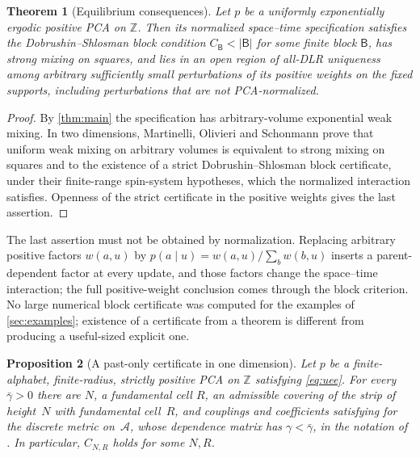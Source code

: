 \documentclass[11pt]{article}
\theoremstyle{plain}
\newtheorem{theorem}{Theorem}[section]
\newtheorem{proposition}[theorem]{Proposition}
\theoremstyle{definition}
\theoremstyle{remark}
\newcommand{\A}{\mathcal{A}}
\newcommand{\Z}{\mathbb{Z}}
\begin{document}
\begin{theorem}[Equilibrium consequences]
\label{thm:equilibrium}
Let $p$ be a uniformly exponentially ergodic positive PCA on $\Z$. Then its normalized space--time specification satisfies the Dobrushin--Shlosman block condition $C_{\mathsf B}<|\mathsf B|$ for some finite block $\mathsf B$, has strong mixing on squares, and lies in an open region of all-DLR uniqueness among arbitrary sufficiently small perturbations of its positive weights on the fixed supports, including perturbations that are not PCA-normalized.
\end{theorem}

\begin{proof}
By \cref{thm:main} the specification has arbitrary-volume exponential weak mixing. In two dimensions, Martinelli, Olivieri and Schonmann \cite[Theorems~1.1 and~3.2]{MOS94} prove that uniform weak mixing on arbitrary volumes is equivalent to strong mixing on squares and to the existence of a strict Dobrushin--Shlosman block certificate, under their finite-range spin-system hypotheses, which the normalized interaction satisfies. Openness of the strict certificate in the positive weights gives the last assertion.
\end{proof}

The last assertion must not be obtained by normalization. Replacing arbitrary positive factors $w(a,u)$ by $p(a\mid u)=w(a,u)/\sum_bw(b,u)$ inserts a parent-dependent factor at every update, and those factors change the space--time interaction; the full positive-weight conclusion comes through the block criterion. No large numerical block certificate was computed for the examples of \cref{sec:examples}; existence of a certificate from a theorem is different from producing a useful-sized explicit one.

\begin{proposition}[A past-only certificate in one dimension]
\label{prop:past-certificate}
Let $p$ be a finite-alphabet, finite-radius, strictly positive PCA on $\Z$ satisfying \eqref{eq:uee}. For every $\bar\gamma>0$ there are $N$, a fundamental cell $R$, an admissible covering of the strip of height~$N$ with fundamental cell~$R$, and couplings and coefficients satisfying \cite[eq.~(3-3)]{MS91} for the discrete metric on~$\A$, whose dependence matrix has $\gamma<\bar\gamma$, in the notation of \cite[Section~3]{MS91}. In particular, $C_{N,R}$ holds for some $N,R$.
\end{proposition}
\end{document}
